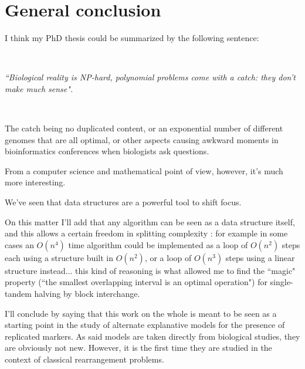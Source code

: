 \documentclass[11pt,final,twoside,nofrench]{thlifl}
\begin{document}
\begin{center} 

\end{center}

\part*{General conclusion}

I think my PhD thesis could be summarized by the following sentence:

~

\textit{``Biological reality is NP-hard, polynomial problems come with a catch: they don't make much sense".}

~

The catch being no duplicated content, or an exponential number of different genomes that are all optimal, or other aspects causing awkward moments in bioinformatics conferences when biologists ask questions.

From a computer science and mathematical point of view, however, it's much more interesting.

We've seen that data structures are a powerful tool to shift focus.

On this matter I'll add that any algorithm can be seen as a data structure itself, and this allows a certain freedom in splitting complexity : for example in some cases an  $O(n^4)$ time algorithm could be implemented as a loop of $O(n^2)$ steps each using a structure built in $O(n^2)$, or a loop of $O(n^3)$ steps using a linear structure instead... this kind of reasoning is what allowed me to find the ``magic" property (``the smallest overlapping interval is an optimal operation") for single-tandem halving by block interchange.

I'll conclude by saying that this work on the whole is meant to be seen as a starting point in the study of alternate explanative models for the presence of replicated markers. As said models are taken directly from biological studies, they are obviously not new. However, it is the first time they are studied in the context of classical rearrangement problems.
\end{document}
